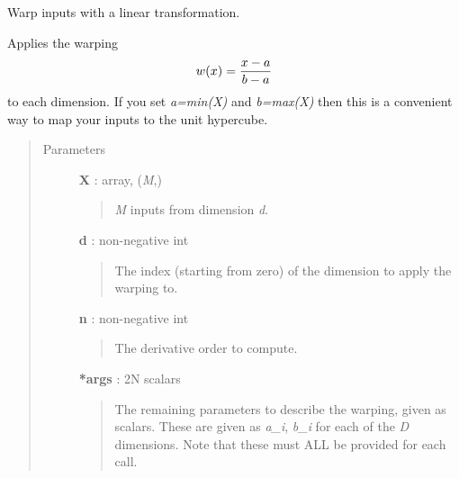 \documentclass[letterpaper,10pt,english]{sphinxmanual}
\begin{document}

\begin{fulllineitems}
\label{gptools.kernel:gptools.kernel.warping.linear_warp}
Warp inputs with a linear transformation.

Applies the warping
\begin{gather}
\begin{split}w(x) = \frac{x-a}{b-a}\end{split}\notag
\end{gather}
to each dimension. If you set \emph{a=min(X)} and \emph{b=max(X)} then this is a
convenient way to map your inputs to the unit hypercube.
\begin{quote}\begin{description}
\item[{Parameters}] \leavevmode
\textbf{X} : array, (\emph{M},)
\begin{quote}

\emph{M} inputs from dimension \emph{d}.
\end{quote}

\textbf{d} : non-negative int
\begin{quote}

The index (starting from zero) of the dimension to apply the warping to.
\end{quote}

\textbf{n} : non-negative int
\begin{quote}

The derivative order to compute.
\end{quote}

\textbf{*args} : 2N scalars
\begin{quote}

The remaining parameters to describe the warping, given as scalars.
These are given as \emph{a\_i}, \emph{b\_i} for each of the \emph{D} dimensions. Note
that these must ALL be provided for each call.
\end{quote}

\end{description}\end{quote}

\end{fulllineitems}

\end{document}
